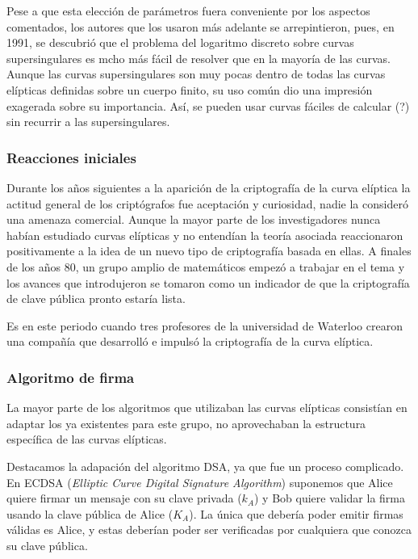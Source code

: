 \documentclass[
  a4paper,
  12pt,
  spanish,
]{scrartcl}
\begin{document}
Pese a que esta elección de parámetros fuera conveniente por los aspectos comentados, los autores que los usaron más adelante se arrepintieron, pues, en 1991, se descubrió que el problema del logaritmo discreto sobre curvas supersingulares es mcho más fácil de resolver que en la mayoría de las curvas. Aunque las curvas supersingulares son muy pocas dentro de todas las curvas elípticas definidas sobre un cuerpo finito, su uso común dio una impresión exagerada sobre su importancia. Así, se pueden usar curvas fáciles de calcular (?)  sin recurrir a las supersingulares.

\subsubsection{Reacciones iniciales}
Durante los años siguientes a la aparición de la criptografía de la curva elíptica la actitud general de los criptógrafos fue aceptación y curiosidad, nadie la consideró una amenaza comercial. Aunque la mayor parte de los investigadores nunca habían estudiado curvas elípticas y no entendían la teoría asociada reaccionaron positivamente a la idea de un nuevo tipo de criptografía basada en ellas. A finales de los años 80, un grupo amplio de matemáticos empezó a trabajar en el tema y los avances que introdujeron se tomaron como un indicador de que la criptografía de clave pública pronto estaría lista.

Es en este periodo cuando tres profesores de la universidad de Waterloo crearon una compañía que desarrolló e impulsó la criptografía de la curva elíptica. 


\subsubsection{Algoritmo de firma}

La mayor parte de los algoritmos que utilizaban las curvas elípticas consistían en adaptar los ya existentes para este grupo, no aprovechaban la estructura específica de las curvas elípticas.

Destacamos la adapación del algoritmo DSA, ya que fue un proceso complicado. En ECDSA (\textit{Elliptic Curve Digital Signature Algorithm}) suponemos que Alice quiere firmar un mensaje con su clave privada ($k_A$) y Bob quiere validar la firma usando la clave pública de Alice ($K_A$). La única que debería poder emitir firmas válidas es Alice, y estas deberían poder ser verificadas por cualquiera que conozca su clave pública.
\end{document}
